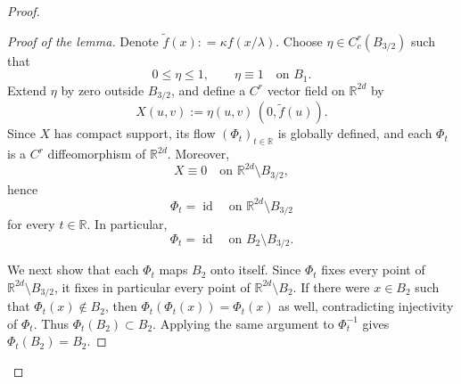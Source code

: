 \documentclass[12pt]{amsart}
\numberwithin{equation}{section}
\theoremstyle{remark}
\begin{document}
\begin{proof}
\begin{proof}[Proof of the lemma]
    Denote $\tilde f(x): = \kappa f(x/\lambda)$.
Choose $\eta\in C_c^r(B_{3/2})$ such that
\begin{equation}
0\le \eta\le 1,
\qquad
\eta\equiv 1 \quad \text{on } B_1.
\end{equation}
Extend $\eta$ by zero outside $B_{3/2}$, and define a $C^r$ vector field on $\mathbb{R}^{2d}$ by
\begin{equation}
X(u,v):=\eta(u,v)\,(0,\tilde f(u)).
\end{equation}
Since $X$ has compact support, its flow $(\Phi_t)_{t\in\mathbb{R}}$ is globally defined, and each $\Phi_t$ is a $C^r$ diffeomorphism of $\mathbb{R}^{2d}$. Moreover,
\begin{equation}
X\equiv 0 \quad \text{on } \mathbb{R}^{2d}\setminus B_{3/2},
\end{equation}
hence
\begin{equation}
\Phi_t=\operatorname{id}
\quad\text{on } \mathbb{R}^{2d}\setminus B_{3/2}
\end{equation}
for every $t\in\mathbb{R}$. In particular,
\begin{equation}
\Phi_t=\operatorname{id}
\quad\text{on } B_2\setminus B_{3/2}.
\end{equation}

We next show that each $\Phi_t$ maps $B_2$ onto itself. Since $\Phi_t$ fixes every point of $\mathbb{R}^{2d}\setminus B_{3/2}$, it fixes in particular every point of $\mathbb{R}^{2d}\setminus B_2$. If there were $x\in B_2$ such that $\Phi_t(x)\notin B_2$, then $\Phi_t(\Phi_t(x))=\Phi_t(x)$ as well, contradicting injectivity of $\Phi_t$. Thus $\Phi_t(B_2)\subset B_2$. Applying the same argument to $\Phi_t^{-1}$ gives $\Phi_t(B_2)=B_2$.


\end{proof}
\end{proof}
\end{document}
